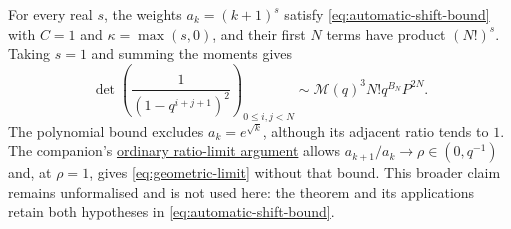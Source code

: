 \documentclass[11pt]{article}
\newcommand{\shortrecordlink}[3]{\href{#1\##2}{#3}}
\begin{document}
For every real $s$, the weights $a_k=(k+1)^s$ satisfy
\eqref{eq:automatic-shift-bound} with $C=1$ and
$\kappa=\max(s,0)$, and their first $N$ terms have product $(N!)^s$.
Taking $s=1$ and summing the moments gives
\begin{equation}\label{eq:squared-cauchy-example}
 \det\left(\frac1{(1-q^{i+j+1})^2}\right)_{0\le i,j<N}
 \sim\mathcal M(q)^3N!q^{B_N}P^{2N}.
\end{equation}
The polynomial bound excludes $a_k=e^{\sqrt{k}}$, although its
adjacent ratio tends to $1$. The companion's
\shortrecordlink{erdos1049-rational-base-lambert-reasoning-surface.pdf}
{long1049-ratio-extension}{ordinary ratio-limit argument}
allows $a_{k+1}/a_k\to\rho\in(0,q^{-1})$ and, at $\rho=1$, gives
\eqref{eq:geometric-limit} without that bound. This broader claim
remains unformalised and is not used here: the theorem and its
applications retain both hypotheses in
\eqref{eq:automatic-shift-bound}.
\end{document}

